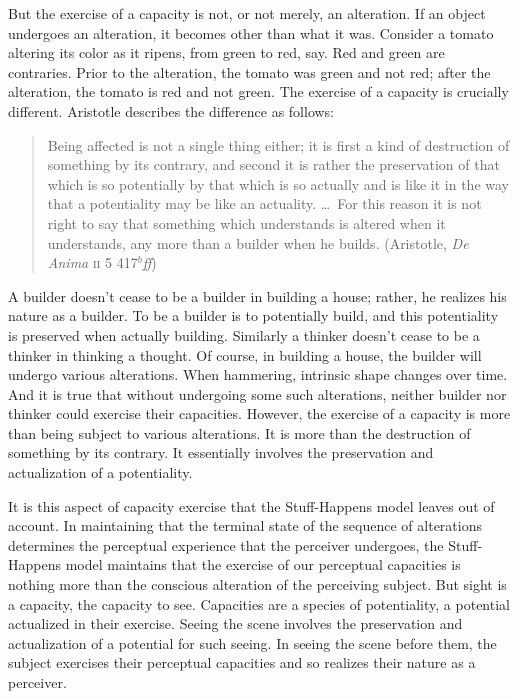 \documentclass[12pt]{article}
\begin{document}
But the exercise of a capacity is not, or not merely, an alteration. If an object undergoes an alteration, it becomes other than what it was. Consider a tomato altering its color as it ripens, from green to red, say. Red and green are contraries. Prior to the alteration, the tomato was green and not red; after the alteration, the tomato is red and not green. The exercise of a capacity is crucially different. Aristotle describes the difference as follows:
\begin{quote}
    Being affected is not a single thing either; it is first a kind of destruction of something by its contrary, and second it is rather the preservation of that which is so potentially by that which is so actually and is like it in the way that a potentiality may be like an actuality. \ldots\ For this reason it is not right to say that something which understands is altered when it understands, any more than a builder when he builds. (Aristotle, \emph{De Anima} \textsc{ii} 5 417\( ^{b} \)\emph{ff})
\end{quote}
A builder doesn't cease to be a builder in building a house; rather, he realizes his nature as a builder. To be a builder is to potentially build, and this potentiality is preserved when actually building. Similarly a thinker doesn't cease to be a thinker in thinking a thought. Of course, in building a house, the builder will undergo various alterations. When hammering, intrinsic shape changes over time. And it is true that without undergoing some such alterations, neither builder nor thinker could exercise their capacities. However, the exercise of a capacity is more than being subject to various alterations. It is more than the destruction of something by its contrary. It essentially involves the preservation and actualization of a potentiality.

It is this aspect of capacity exercise that the Stuff-Happens model leaves out of account. In maintaining that the terminal state of the sequence of alterations determines the perceptual experience that the perceiver undergoes, the Stuff-Happens model maintains that the exercise of our perceptual capacities is nothing more than the conscious alteration of the perceiving subject. But sight is a capacity, the capacity to see. Capacities are a species of potentiality, a potential actualized in their exercise. Seeing the scene involves the preservation and actualization of a potential for such seeing. In seeing the scene before them, the subject exercises their perceptual capacities and so realizes their nature as a perceiver.
\end{document}
